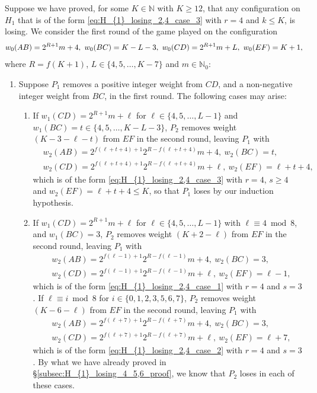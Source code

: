 \documentclass[11pt,reqno]{amsart}
\theoremstyle{definition}
\theoremstyle{definition}
\begin{document}
Suppose we have proved, for some $K \in \mathbb{N}$ with $K \geqslant 12$, that any configuration on $H_{1}$ that is of the form \eqref{eq:H_{1}_losing_2,4_case_3} with $r=4$ and $k\leqslant K$, is losing. We consider the first round of the game played on the configuration
\begin{equation}
w_{0}(AB)=2^{R+1}m+4,\ w_{0}(BC)=K-L-3,\ w_{0}(CD)=2^{R+1}m+L,\ w_{0}(EF)=K+1,\label{eq:H_{1}_losing_4_7_inductive}
\end{equation}
where $R=f(K+1)$, $L\in\{4,5,\ldots,K-7\}$ and $m\in\mathbb{N}_{0}$:
\begin{enumerate}
\item Suppose $P_{1}$ removes a positive integer weight from $CD$, and a non-negative integer weight from $BC$, in the first round. The following cases may arise:
\begin{enumerate}
\item If $w_{1}(CD)=2^{R+1}m+\ell$ for $\ell\in\{4,5,\ldots,L-1\}$ and $w_{1}(BC)=t\in\{4,5,\ldots,K-L-3\}$, $P_{2}$ removes weight $(K-3-\ell-t)$ from $EF$ in the second round, leaving $P_{1}$ with
\begin{align}
{}&w_{2}(AB)=2^{f(\ell+t+4)+1}2^{R-f(\ell+t+4)}m+4,\ w_{2}(BC)=t,\nonumber\\
{}&w_{2}(CD)=2^{f(\ell+t+4)+1}2^{R-f(\ell+t+4)}m+\ell,\ w_{2}(EF)=\ell+t+4,\nonumber
\end{align}
which is of the form \eqref{eq:H_{1}_losing_2,4_case_3} with $r=4$, $s\geqslant 4$ and $w_{2}(EF)=\ell+t+4\leqslant K$, so that $P_{1}$ loses by our induction hypothesis.

\item If $w_{1}(CD)=2^{R+1}m+\ell$ for $\ell \in \{4,5,\ldots,L-1\}$ with $\ell \equiv 4 \bmod 8$, and $w_{1}(BC)=3$, $P_{2}$ removes weight $(K+2-\ell)$ from $EF$ in the second round, leaving $P_{1}$ with
\begin{align}
{}&w_{2}(AB)=2^{f(\ell-1)+1}2^{R-f(\ell-1)}m+4,\ w_{2}(BC)=3,\nonumber\\
{}&w_{2}(CD)=2^{f(\ell-1)+1}2^{R-f(\ell-1)}m+\ell,\ w_{2}(EF)=\ell-1,\nonumber
\end{align}
which is of the form \eqref{eq:H_{1}_losing_2,4_case_1} with $r=4$ and $s=3$. If $\ell\equiv i \bmod 8$ for $i \in \{0,1,2,3,5,6,7\}$, $P_{2}$ removes weight $(K-6-\ell)$ from $EF$ in the second round, leaving $P_{1}$ with
\begin{align}
{}&w_{2}(AB)=2^{f(\ell+7)+1}2^{R-f(\ell+7)}m+4,\ w_{2}(BC)=3,\nonumber\\
{}&w_{2}(CD)=2^{f(\ell+7)+1}2^{R-f(\ell+7)}m+\ell,\ w_{2}(EF)=\ell+7,\nonumber
\end{align}
which is of the form \eqref{eq:H_{1}_losing_2,4_case_2} with $r=4$ and $s=3$. By what we have already proved in \S\ref{subsec:H_{1}_losing_4_5,6_proof}, we know that $P_{2}$ loses in each of these cases.


\end{enumerate}
\end{enumerate}
\end{document}
